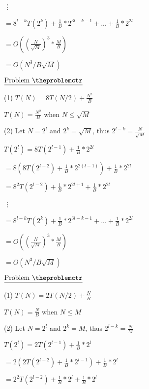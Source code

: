 \documentclass[11pt]{article}
\def\pp{\par\noindent}
\begin{document}
\hspace{1.5 cm} \vdots

\hspace{1.0 cm}$= 8^{l-k}T(2^{k})+\frac{1}{B}*2^{3l-k-1}+...+\frac{1}{B}*2^{2l}$

\hspace{1.0 cm}$= O((\frac{N}{\sqrt{M}})^3*\frac{M}{B})$

\hspace{1.0 cm}$= O(N^3/B\sqrt{M})$

\vfill
\newpage
\addtocounter{problemctr}{1}
\bigskip
\noindent
$\underline{\rm Problem\ \theproblemctr}$\pp 

\noindent
(1) $T(N) = 8T(N/2)+\frac{N^2}{B}$

$T(N) = \frac{N^2}{B}$ when $N \le \sqrt{M}$

\bigskip
\bigskip
\noindent
(2) Let $N = 2^l$ and $2^k = \sqrt{M}$, thus $2^{l-k} = \frac{N}{\sqrt{M}}$

$T(2^l) = 8T(2^{l-1})+\frac{1}{B}*2^{2l}$ 

\hspace{1.0 cm}$= 8(8T(2^{l-2})+\frac{1}{B}*2^{2(l-1)})+\frac{1}{B}*2^{2l}$

\hspace{1.0 cm}$= 8^{2}T(2^{l-2})+\frac{1}{B}*2^{2l+1}+\frac{1}{B}*2^{2l}$

\hspace{1.5 cm} \vdots

\hspace{1.0 cm}$= 8^{l-k}T(2^{k})+\frac{1}{B}*2^{3l-k-1}+...+\frac{1}{B}*2^{2l}$

\hspace{1.0 cm}$= O((\frac{N}{\sqrt{M}})^3*\frac{M}{B})$

\hspace{1.0 cm}$= O(N^3/B\sqrt{M})$

\vfill
\newpage
\addtocounter{problemctr}{1}
\bigskip
\noindent
$\underline{\rm Problem\ \theproblemctr}$\pp

\noindent
(1) $T(N) = 2T(N/2)+\frac{N}{B}$

$T(N) = \frac{N}{B}$ when $N \le M$

\bigskip
\bigskip
\noindent
(2) Let $N = 2^l$ and $2^k = M$, thus $2^{l-k} = \frac{N}{M}$

$T(2^l) = 2T(2^{l-1})+\frac{1}{B}*2^{l}$

\hspace{1.0 cm}$= 2(2T(2^{l-2})+\frac{1}{B}*2^{l-1})+\frac{1}{B}*2^{l}$

\hspace{1.0 cm}$= 2^{2}T(2^{l-2})+\frac{1}{B}*2^{l}+\frac{1}{B}*2^{l}$
\end{document}
